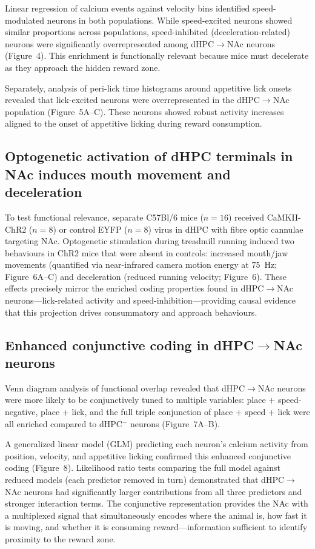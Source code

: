 \documentclass[11pt]{article}
\begin{document}
Linear regression of calcium events against velocity bins identified speed-modulated neurons in both populations. While speed-excited neurons showed similar proportions across populations, speed-inhibited (deceleration-related) neurons were significantly overrepresented among dHPC$\to$NAc neurons (Figure~4). This enrichment is functionally relevant because mice must decelerate as they approach the hidden reward zone.

Separately, analysis of peri-lick time histograms around appetitive lick onsets revealed that lick-excited neurons were overrepresented in the dHPC$\to$NAc population (Figure~5A--C). These neurons showed robust activity increases aligned to the onset of appetitive licking during reward consumption.

\subsection{Optogenetic activation of dHPC terminals in NAc induces mouth movement and deceleration}

To test functional relevance, separate C57Bl/6 mice ($n = 16$) received CaMKII-ChR2 ($n = 8$) or control EYFP ($n = 8$) virus in dHPC with fibre optic cannulae targeting NAc. Optogenetic stimulation during treadmill running induced two behaviours in ChR2 mice that were absent in controls: increased mouth/jaw movements (quantified via near-infrared camera motion energy at 75~Hz; Figure~6A--C) and deceleration (reduced running velocity; Figure~6). These effects precisely mirror the enriched coding properties found in dHPC$\to$NAc neurons---lick-related activity and speed-inhibition---providing causal evidence that this projection drives consummatory and approach behaviours.

\subsection{Enhanced conjunctive coding in dHPC$\to$NAc neurons}

Venn diagram analysis of functional overlap revealed that dHPC$\to$NAc neurons were more likely to be conjunctively tuned to multiple variables: place + speed-negative, place + lick, and the full triple conjunction of place + speed + lick were all enriched compared to dHPC$^{-}$ neurons (Figure~7A--B).

A generalized linear model (GLM) predicting each neuron's calcium activity from position, velocity, and appetitive licking confirmed this enhanced conjunctive coding (Figure~8). Likelihood ratio tests comparing the full model against reduced models (each predictor removed in turn) demonstrated that dHPC$\to$NAc neurons had significantly larger contributions from all three predictors and stronger interaction terms. The conjunctive representation provides the NAc with a multiplexed signal that simultaneously encodes where the animal is, how fast it is moving, and whether it is consuming reward---information sufficient to identify proximity to the reward zone.
\end{document}
